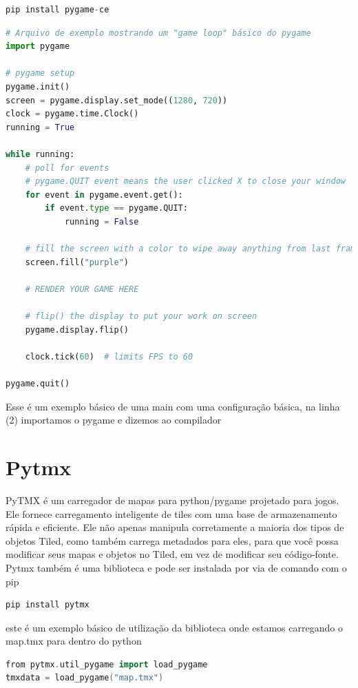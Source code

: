 \newpage
\begin{lstlisting}[language=C++,breaklines, caption= Instalação Pytmx]
pip install pygame-ce
\end{lstlisting}

\begin{lstlisting}[language=Python,breaklines, caption= Exemplo de main de um projeto Pygame]
# Arquivo de exemplo mostrando um "game loop" básico do pygame
import pygame

# pygame setup
pygame.init() 
screen = pygame.display.set_mode((1280, 720))
clock = pygame.time.Clock()
running = True

while running:
    # poll for events
    # pygame.QUIT event means the user clicked X to close your window
    for event in pygame.event.get():
        if event.type == pygame.QUIT:
            running = False

    # fill the screen with a color to wipe away anything from last frame
    screen.fill("purple")

    # RENDER YOUR GAME HERE

    # flip() the display to put your work on screen
    pygame.display.flip()

    clock.tick(60)  # limits FPS to 60

pygame.quit()
\end{lstlisting}
Esse é um exemplo básico de uma main  com uma configuração básica, na linha (2) importamos o pygame e dizemos ao compilador 


\section{Pytmx}
PyTMX é um carregador de mapas para python/pygame projetado para jogos. Ele fornece carregamento inteligente de tiles com uma base de armazenamento rápida e eficiente. Ele não apenas manipula corretamente a maioria dos tipos de objetos Tiled, como também carrega metadados para eles, para que você possa modificar seus mapas e objetos no Tiled, em vez de modificar seu código-fonte.\cite{PyTMX} 
Pytmx também é uma biblioteca e pode ser instalada por via de comando com o pip 
\begin{lstlisting}[language=C++,breaklines, caption= Instalacao Pytmx]
pip install pytmx
\end{lstlisting}

este é um exemplo básico de utilização da biblioteca onde estamos carregando o map.tmx para dentro do python
\begin{lstlisting}[language=C++,breaklines, caption= utilização básica Pytmx]
from pytmx.util_pygame import load_pygame
tmxdata = load_pygame("map.tmx")
\end{lstlisting}

